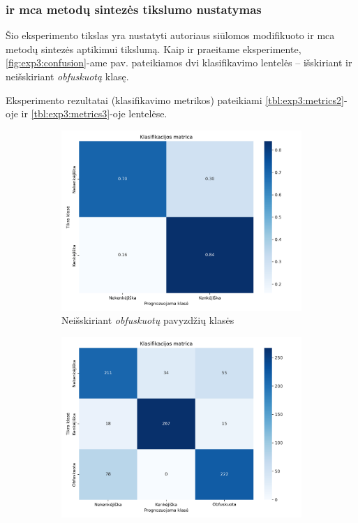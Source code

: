 \subsubsection{\LIME ir \gls{mca} metodų sintezės tikslumo nustatymas}

Šio eksperimento tikslas yra nustatyti autoriaus siūlomos modifikuoto \LIME ir \gls{mca} metodų sintezės  aptikimui tikslumą. Kaip ir praeitame eksperimente, \ref{fig:exp3:confusion}-ame pav. pateikiamos dvi klasifikavimo lentelės -- išskiriant ir neišskiriant \textit{obfuskuotą} klasę. 

Eksperimento rezultatai (klasifikavimo metrikos) pateikiami \ref{tbl:exp3:metrics2}-oje ir \ref{tbl:exp3:metrics3}-oje lentelėse.

\begin{figure}[h]
    \begin{subfigure}{0.5\textwidth}
        \centering
        \includegraphics[width=\textwidth]{images/synthesis_2x2.png}
        \caption{Neišskiriant \textit{obfuskuotų} pavyzdžių klasės}
    \end{subfigure}
    \begin{subfigure}{0.5\textwidth}
        \centering
        \includegraphics[width=\textwidth]{images/synthesis_3x3.png}

\end{subfigure}
\end{figure}

